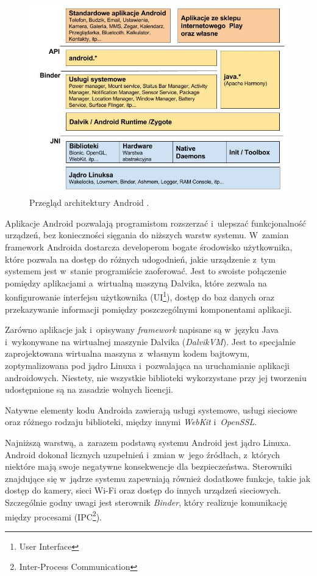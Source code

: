 \begin{figure}[!htb]
    \centering
    \includegraphics[width=14cm]{imgs/ch3_android_architecture_1.jpg}
    \caption
{Przegląd architektury Android \cite{website:android:przegladarchitektury}.}
    \label{fig:ch3_android_architecture_1}
\end{figure} 

Aplikacje Android pozwalają programistom rozszerzać i~ulepszać funkcjonalność urządzeń, bez konieczności sięgania do niższych warstw systemu. W~zamian framework Androida dostarcza developerom bogate środowisko użytkownika, które pozwala na dostęp do różnych udogodnień, jakie urządzenie z~tym systemem jest w~stanie programiście zaoferować. Jest to swoiste połączenie pomiędzy aplikacjami a~wirtualną maszyną Dalvika, które zezwala na konfigurowanie interfejsu użytkownika (UI\footnote{User Interface}), dostęp do baz danych oraz przekazywanie informacji pomiędzy poszczególnymi komponentami aplikacji.

Zarówno aplikacje jak i~opisywany \textit{framework} napisane są w~języku Java i~wykonywane na wirtualnej maszynie Dalvika (\textit{DalvikVM}). Jest to specjalnie zaprojektowana wirtualna maszyna z~własnym kodem bajtowym, zoptymalizowana pod jądro Linuxa i~pozwalająca na uruchamianie aplikacji androidowych. Niestety, nie wszystkie biblioteki wykorzystane przy jej tworzeniu udostępnione są na zasadzie wolnych licencji.

Natywne elementy kodu Androida zawierają usługi systemowe, usługi sieciowe oraz różnego rodzaju biblioteki, między innymi \textit{WebKit} i~\textit{OpenSSL}. 

Najniższą warstwą, a~zarazem podstawą systemu Android jest jądro Linuxa. Android dokonał licznych uzupełnień i~zmian w~jego źródłach, z~których niektóre mają swoje negatywne konsekwencje dla bezpieczeństwa. Sterowniki znajdujące się w~jądrze systemu zapewniają również dodatkowe funkcje, takie jak dostęp do kamery, sieci Wi-Fi oraz dostęp do innych urządzeń sieciowych. Szczególnie godny uwagi jest sterownik \textit{Binder}, który realizuje komunikację między procesami \cite{bib:hacker:handbook} (IPC\footnote{Inter-Process Communication}).

